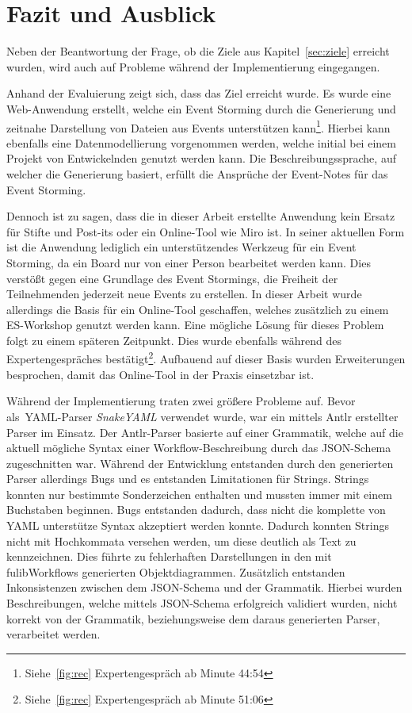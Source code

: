 \chapter{Fazit und Ausblick}\label{ch:fazit}

Neben der Beantwortung der Frage, ob die Ziele aus Kapitel~\ref{sec:ziele} erreicht wurden, wird auch auf Probleme während
der Implementierung eingegangen.

Anhand der Evaluierung zeigt sich, dass das Ziel erreicht wurde.
Es wurde eine Web-Anwendung erstellt, welche ein Event Storming durch die Generierung und zeitnahe Darstellung von Dateien aus Events unterstützen kann\footnote{Siehe~\ref{fig:rec} Expertengespräch ab Minute  44:54}.
Hierbei kann ebenfalls eine Datenmodellierung vorgenommen werden, welche initial bei einem Projekt von Entwickelnden genutzt werden kann.
Die Beschreibungssprache, auf welcher die Generierung basiert, erfüllt die Ansprüche der Event-Notes für das Event Storming.

Dennoch ist zu sagen, dass die in dieser Arbeit erstellte Anwendung kein Ersatz für Stifte und Post-its\textsuperscript{\textregistered} oder ein Online-Tool wie Miro ist.
In seiner aktuellen Form ist die Anwendung lediglich ein unterstützendes Werkzeug für ein Event Storming, da ein Board nur von einer Person bearbeitet werden kann.
Dies verstößt gegen eine Grundlage des Event Stormings, die Freiheit der Teilnehmenden jederzeit neue Events zu erstellen.
In dieser Arbeit wurde allerdings die Basis für ein Online-Tool geschaffen, welches zusätzlich zu einem \ac{ES}-Workshop genutzt werden kann.
Eine mögliche Lösung für dieses Problem folgt zu einem späteren Zeitpunkt.
Dies wurde ebenfalls während des Expertengespräches bestätigt\footnote{Siehe~\ref{fig:rec} Expertengespräch ab Minute  51:06}.
Aufbauend auf dieser Basis wurden Erweiterungen besprochen, damit das Online-Tool in der Praxis einsetzbar ist.

Während der Implementierung traten zwei größere Probleme auf.
Bevor als~\ac{YAML}-Parser \textit{SnakeYAML} verwendet wurde, war ein mittels \ac{Antlr} erstellter Parser im Einsatz.
Der \ac{Antlr}-Parser basierte auf einer Grammatik, welche auf die aktuell mögliche Syntax einer Workflow-Beschreibung durch das JSON-Schema zugeschnitten war.
Während der Entwicklung entstanden durch den generierten Parser allerdings Bugs und es entstanden Limitationen für Strings.
Strings konnten nur bestimmte Sonderzeichen enthalten und mussten immer mit einem Buchstaben beginnen.
Bugs entstanden dadurch, dass nicht die komplette von YAML unterstütze Syntax akzeptiert werden konnte.
Dadurch konnten Strings nicht mit Hochkommata versehen werden, um diese deutlich als Text zu kennzeichnen.
Dies führte zu fehlerhaften Darstellungen in den mit fulibWorkflows generierten Objektdiagrammen.\newline
Zusätzlich entstanden Inkonsistenzen zwischen dem JSON-Schema und der Grammatik.
Hierbei wurden Beschreibungen, welche mittels JSON-Schema erfolgreich validiert wurden, nicht korrekt von der Grammatik, beziehungsweise dem daraus generierten Parser, verarbeitet werden.

